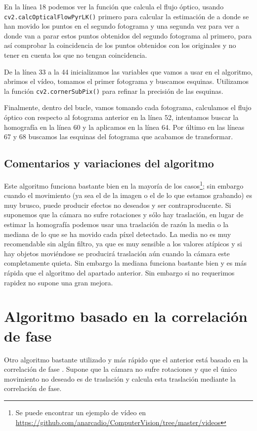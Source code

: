 \documentclass[a4paper,openright, 12pt]{book}
\begin{document}
En la línea 18 podemos ver la función que calcula el flujo óptico, usando \lstinline|cv2.calcOpticalFlowPyrLK()| primero para calcular la estimación de a donde se han movido los puntos en el segundo fotograma y una segunda vez para ver a donde van a parar estos puntos obtenidos del segundo fotograma al primero, para así comprobar la coincidencia de los puntos obtenidos con los originales y no tener en cuenta los que no tengan coincidencia.

De la línea 33 a la 44 inicializamos las variables que vamos a usar en el algoritmo, abrimos el vídeo, tomamos el primer fotograma y buscamos esquinas. Utilizamos la función \lstinline|cv2.cornerSubPix()| para refinar la precisión de las esquinas.

Finalmente, dentro del bucle, vamos tomando cada fotograma, calculamos el flujo óptico con respecto al fotograma anterior en la línea 52, intentamos buscar la homografía en la línea 60 y la aplicamos en la línea 64. Por último en las líneas 67 y 68 buscamos las esquinas del fotograma que acabamos de transformar.
 
\subsection{Comentarios y variaciones del algoritmo}
Este algoritmo funciona bastante bien en la mayoría de los casos\footnote{Se puede encontrar un ejemplo de vídeo en \url{https://github.com/anarcadio/ComputerVision/tree/master/videos}}; sin embargo cuando el movimiento (ya sea el de la imagen o el de lo que estamos grabando) es muy brusco, puede producir efectos no deseados y ser contraproducente. Si suponemos que la cámara no sufre rotaciones y sólo hay traslación, en lugar de estimar la homografía podemos usar una traslación de razón la media o la mediana de lo que se ha movido cada píxel detectado. La media no es muy recomendable sin algún filtro, ya que es muy sensible a los valores atípicos y si hay objetos moviéndose se producirá traslación aún cuando la cámara este completamente quieta. Sin embargo la mediana funciona bastante bien y es más rápida que el algoritmo del apartado anterior. Sin embargo si no requerimos rapidez no supone una gran mejora.

\section{Algoritmo basado en la correlación de fase}
Otro algoritmo bastante utilizado y más rápido que el anterior está basado en la correlación de fase \cite{kug75}. Supone que la cámara no sufre rotaciones y que el único movimiento no deseado es de traslación y calcula esta traslación mediante la correlación de fase.
\end{document}
